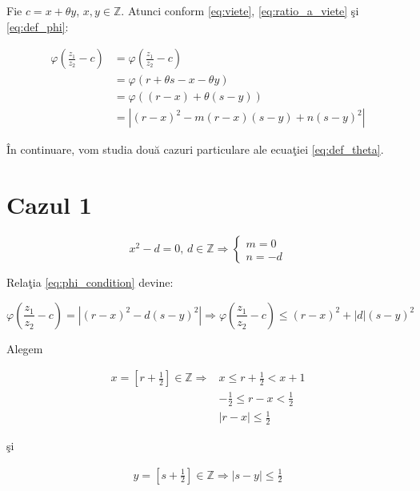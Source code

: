 \documentclass[12pt]{article}
\begin{document}
Fie $c = x + \theta y$, $x, y \in \mathbb{Z}$.
Atunci conform \eqref{eq:viete}, \eqref{eq:ratio_a_viete} şi \eqref{eq:def_phi}:

\begin{equation} \label{eq:phi_condition}
\begin{split}
    \varphi  \left(\frac{z_1}{z_2} - c\right) & =\varphi  \left(\frac{z_1}{z_2} - c\right) \\
    &=\varphi(r + \theta s - x - \theta y) \\
    &= \varphi \left( (r-x) + \theta(s-y) \right) \\
    &=  \left| (r-x)^2 - m(r-x)(s-y) + n(s-y)^2\right|
\end{split}
\end{equation}

În continuare, vom studia două cazuri particulare ale ecuaţiei \eqref{eq:def_theta}.

\section*{Cazul 1} 
\begin{equation} \label{eq:case_1}
    x^2 - d = 0, \, d \in \mathbb{Z} \Rightarrow \begin{cases} m = 0 \\ n = -d \end{cases}
\end{equation}

Relaţia \eqref{eq:phi_condition} devine:

\begin{equation} \label{eq:phi_condition_case1}
    \varphi \left(\frac{z_1}{z_2} - c\right)  = \left| (r-x)^2 - d(s-y)^2 \right| 
   \Rightarrow \varphi \left(\frac{z_1}{z_2} - c\right) \leq (r-x)^2 + |d|(s-y)^2
\end{equation}

Alegem

\begin{equation}
\begin{split}
    x = \left[ r + \frac{1}{2} \right] \in \mathbb{Z} \Rightarrow & x \leq r + \frac{1}{2} < x + 1 \\
    & -\frac{1}{2} \leq r - x < \frac{1}{2} \\
    & \boxed{|r - x| \leq \frac{1}{2}}
\end{split}
\end{equation}

şi

\begin{equation}
\begin{split}
    y = \left[ s + \frac{1}{2} \right] \in \mathbb{Z} \Rightarrow \boxed{|s - y| \leq \frac{1}{2}}
\end{split}
\end{equation}
\end{document}
